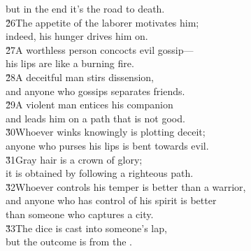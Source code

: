 \begin{poetry}
\poemll    but in the end it's the road to death. \\
\poeml \v{26}The appetite of the laborer motivates him; \\
\poemll    indeed, his hunger drives him on. \\
\poeml \v{27}A worthless person concocts evil gossip--- \\
\poemll    his lips are like a burning fire. \\
\poeml \v{28}A deceitful man stirs dissension, \\
\poemll    and anyone who gossips separates friends. \\
\poeml \v{29}A violent man entices his companion \\
\poemll    and leads him on a path that is not good. \\
\poeml \v{30}Whoever winks knowingly is plotting deceit; \\
\poemll    anyone who purses his lips is bent towards evil. \\
\poeml \v{31}Gray hair is a crown of glory; \\
\poemll    it is obtained by following a righteous path. \\
\poeml \v{32}Whoever controls his temper is better than a warrior, \\
\poemll    and anyone who has control of his spirit is better \\
\poemlll       than someone who captures a city. \\
\poeml \v{33}The dice is cast into someone's lap, \\
\poemll    but the outcome is from the .
\end{poetry}

